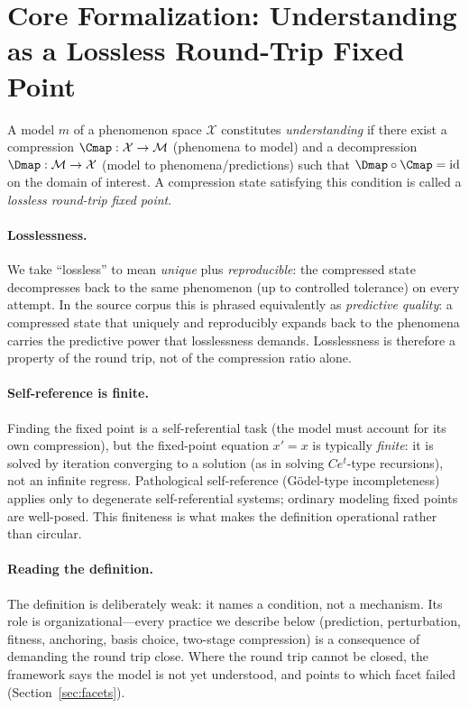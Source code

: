 \section{Core Formalization: Understanding as a Lossless Round-Trip Fixed Point}
\label{sec:core}

\begin{definition}
\label{def:fixedpoint}
A model $m$ of a phenomenon space $\mathcal{X}$ constitutes \emph{understanding}
if there exist a compression $\Cmap:\mathcal{X}\to\mathcal{M}$ (phenomena to
model) and a decompression $\Dmap:\mathcal{M}\to\mathcal{X}$ (model to
phenomena/predictions) such that $\Dmap\circ\Cmap = \mathrm{id}$ on the domain of
interest. A compression state satisfying this condition is called a
\emph{lossless round-trip fixed point}.
\end{definition}

\paragraph{Losslessness.}
We take ``lossless'' to mean \emph{unique} plus \emph{reproducible}: the
compressed state decompresses back to the same phenomenon (up to controlled
tolerance) on every attempt. In the source corpus this is phrased equivalently
as \emph{predictive quality}: a compressed state that uniquely and reproducibly
expands back to the phenomena carries the predictive power that losslessness
demands. Losslessness is therefore a property of the round trip, not of the
compression ratio alone.

\paragraph{Self-reference is finite.}
Finding the fixed point is a self-referential task (the model must account for
its own compression), but the fixed-point equation $x' = x$ is typically
\emph{finite}: it is solved by iteration converging to a solution (as in solving
$Ce^{t}$-type recursions), not an infinite regress. Pathological self-reference
(G\"odel-type incompleteness) applies only to degenerate self-referential
systems; ordinary modeling fixed points are well-posed. This finiteness is what
makes the definition operational rather than circular.

\paragraph{Reading the definition.}
The definition is deliberately weak: it names a condition, not a mechanism. Its
role is organizational---every practice we describe below (prediction,
perturbation, fitness, anchoring, basis choice, two-stage compression) is a
consequence of demanding the round trip close. Where the round trip cannot be
closed, the framework says the model is not yet understood, and points to which
facet failed (Section~\ref{sec:facets}).
